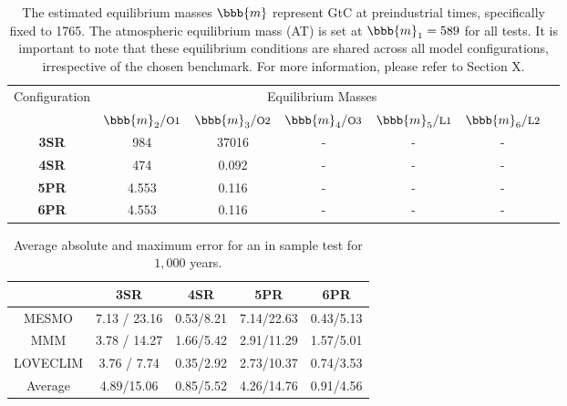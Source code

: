 \begin{table}[ht]
\centering
\small
\begin{tabular}{ccccccc}
\multirow{2}{*}{Configuration} & 
\multicolumn{5}{c}{Equilibrium Masses \vspace{0.2em}}\\   &
$\bbb{m}_2 / \footnotesize{\text{O1}} $&
$\bbb{m}_3 / \footnotesize{\text{O2}} $&
$\bbb{m}_4 / \footnotesize{\text{O3}} $&
$\bbb{m}_5 / \footnotesize{\text{L1}} $&
$\bbb{m}_6 / \footnotesize{\text{L2}} $&\\ 
%
\toprule
\toprule
    \textbf{3SR} & 
    984 & 37016 & - & - & - \\
    \textbf{4SR} & 
    474 & 0.092 & - & - & - \\
    \textbf{5PR} & 
    4.553 & 0.116 & - & - & - \\
    \textbf{6PR} & 
    4.553 & 0.116 & - & - & - \\
    \end{tabular}
    \caption{The estimated equilibrium masses $\bbb{m}$ represent GtC at preindustrial times, specifically fixed to 1765. The atmospheric equilibrium mass (AT) is set at $\bbb{m}_1=589$ for all tests. It is important to note that these equilibrium conditions are shared across all model configurations, irrespective of the chosen benchmark. For more information, please refer to Section X.}
\end{table}


\begin{table}[ht]
\centering
\begin{tabular}{ccccc}
         & \textbf{3SR} & \textbf{4SR} & \textbf{5PR} & \textbf{6PR} \\
         \toprule
MESMO    & 7.13 / 23.16   & 0.53/8.21  & 7.14/22.63 & 0.43/5.13 \\
MMM      & 3.78 / 14.27   & 1.66/5.42  & 2.91/11.29 & 1.57/5.01 \\
LOVECLIM & 3.76 / 7.74    & 0.35/2.92  & 2.73/10.37 & 0.74/3.53 \\
\midrule
Average  & 4.89/15.06 & 0.85/5.52 & 4.26/14.76 & 0.91/4.56 
\end{tabular}
    \caption{Average absolute and maximum error for an in sample test for $1,000$ years.}
\end{table}

